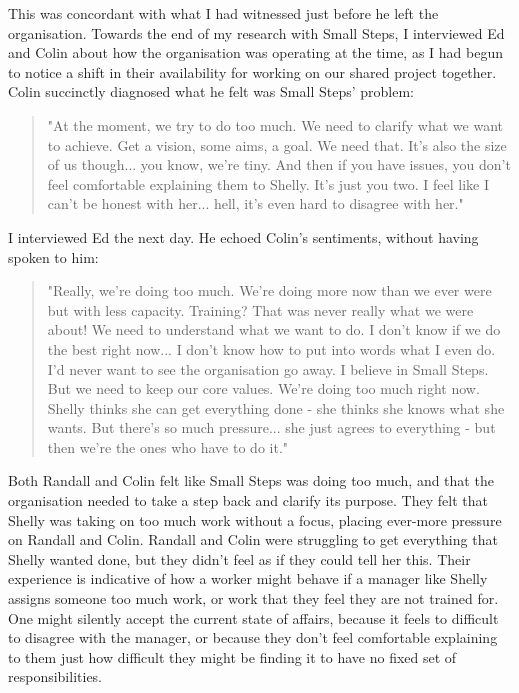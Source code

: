 This was concordant with what I had witnessed just before he left the organisation. Towards the end of my research with Small Steps, I interviewed Ed and Colin about how the organisation was operating at the time, as I had begun to notice a shift in their availability for working on our shared project together. Colin succinctly diagnosed what he felt was Small Steps’ problem:
\begin{quote}
"At the moment, we try to do too much. We need to clarify what we want to achieve. Get a vision, some aims, a goal. We need that. It's also the size of us though... you know, we're tiny. And then if you have issues, you don't feel comfortable explaining them to Shelly. It's just you two. I feel like I can't be honest with her... hell, it's even hard to disagree with her."
\end{quote}
I interviewed Ed the next day. He echoed Colin’s sentiments, without having spoken to him:
\begin{quote}
"Really, we're doing too much. We're doing more now than we ever were but with less capacity. Training? That was never really what we were about! We need to understand what we want to do. I don't know if we do the best right now... I don't know how to put into words what I even do. I'd never want to see the organisation go away. I believe in Small Steps. But we need to keep our core values. We're doing too much right now. Shelly thinks she can get everything done - she thinks she knows what she wants. But there's so much pressure... she just agrees to everything - but then we're the ones who have to do it."
\end{quote}
Both Randall and Colin felt like Small Steps was doing too much, and that the organisation needed to take a step back and clarify its purpose. They felt that Shelly was taking on too much work without a focus, placing ever-more pressure on Randall and Colin. Randall and Colin were struggling to get everything that Shelly wanted done, but they didn't feel as if they could tell her this. Their experience is indicative of how a worker might behave if a manager like Shelly assigns someone too much work, or work that they feel they are not trained for. One might silently accept the current state of affairs, because it feels to difficult to disagree with the manager, or because they don't feel comfortable explaining to them just how difficult they might be finding it to have no fixed set of responsibilities.  

